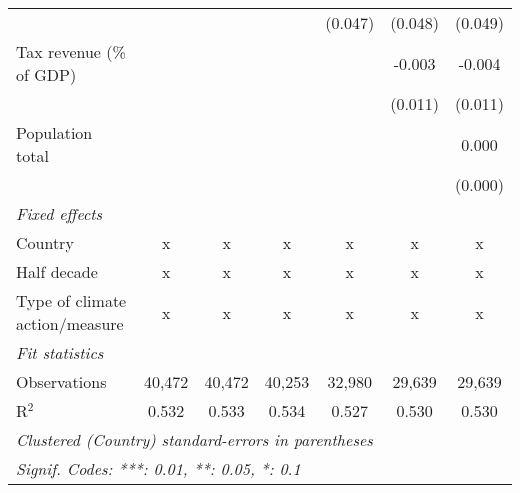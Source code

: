 \begin{tabular}{lcccccc}
                                                             &         &               &               & (0.047)       & (0.048)       & (0.049)\\   
   Tax revenue (\% of GDP)                                   &         &               &               &               & -0.003        & -0.004\\   
                                                             &         &               &               &               & (0.011)       & (0.011)\\   
   Population total                                          &         &               &               &               &               & 0.000\\   
                                                             &         &               &               &               &               & (0.000)\\   
   \emph{Fixed effects}\\
   Country                                                   & x       & x             & x             & x             & x             & x\\  
   Half decade                                               & x       & x             & x             & x             & x             & x\\  
   Type of climate action/measure                            & x       & x             & x             & x             & x             & x\\  
   \midrule \emph{Fit statistics}\\
   Observations                                              & 40,472  & 40,472        & 40,253        & 32,980        & 29,639        & 29,639\\  
   R$^2$                                                     & 0.532   & 0.533         & 0.534         & 0.527         & 0.530         & 0.530\\  
   \midrule
   \multicolumn{7}{l}{\emph{Clustered (Country) standard-errors in parentheses}}\\
   \multicolumn{7}{l}{\emph{Signif. Codes: ***: 0.01, **: 0.05, *: 0.1}}\\
\end{tabular}
\par\endgroup


